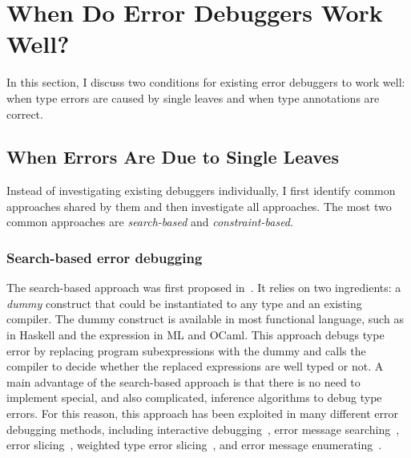 \documentclass[12pt]{report}	%
\begin{document}
\section{When Do Error Debuggers Work Well?}
\label{sec:backgroud:challenge}

In this section, I discuss two conditions for existing error debuggers to work well:
when type errors are caused by single leaves and when type annotations are correct.

\subsection{When Errors Are Due to Single Leaves}
\label{sec:background:leaves}

Instead of investigating existing debuggers individually,
I first identify common approaches shared by them and then investigate all approaches.
The most two common approaches are
\emph{search-based} and \emph{constraint-based}.

\subsubsection{Search-based error debugging}
\label{sec:background:leaves:search}

The search-based approach was first proposed in~\cite{Bernstein95:DTE}.
%
It relies on two ingredients: a \emph{dummy}
construct that could be instantiated to any type and
an existing compiler. The dummy construct is
available in most functional language, such as
 in Haskell
and the  expression in ML and OCaml.
%
This approach debugs type error by replacing program subexpressions
with the dummy and calls the compiler to decide whether
the replaced expressions are well typed or not.
%
A main advantage of the search-based approach is that there is no
need to implement special, and also complicated, inference
algorithms to debug type errors.
For this reason, this approach has been
exploited in many different error debugging methods,
including interactive
debugging~\cite{Brassel04:TH,Tsushima13:ETD},
error message
searching~\cite{Lerner06:SSM,Lerner07:STM},
error slicing~\cite{Schilling12:CFT},
weighted type error
slicing~\cite{TSUSHIMA14:WTE}, and error message
enumerating~\cite{Tsushima14:ECF}.
\end{document}
